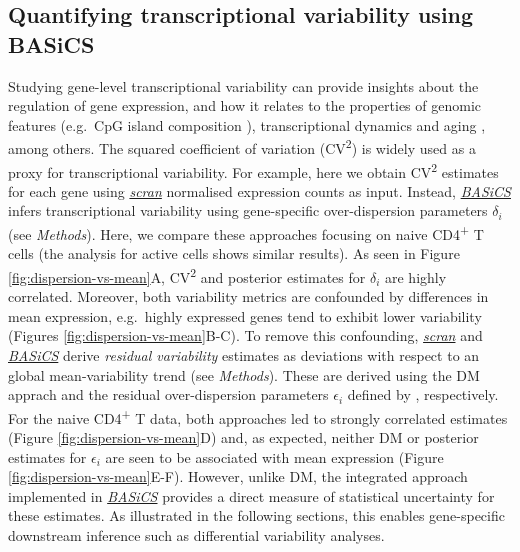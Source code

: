 \documentclass[9pt,a4paper,]{extarticle}
\begin{document}
\hypertarget{quantifying-transcriptional-variability-using-basics}{%
\subsection{Quantifying transcriptional variability using BASiCS}\label{quantifying-transcriptional-variability-using-basics}}

Studying gene-level transcriptional variability can provide insights about the
regulation of gene expression, and how it relates to the properties of genomic
features (e.g.~CpG island composition \citep{Morgan2018}), transcriptional dynamics
\citep{Antolovic2017} and aging \citep{Martinez-jimenez2017}, among others.
The squared coefficient of variation (CV\textsuperscript{2}) is widely used as a proxy for
transcriptional variability.
For example, here we obtain CV\textsuperscript{2} estimates for each gene using
\emph{\href{https://bioconductor.org/packages/3.11/scran}{scran}} normalised expression counts as input.
Instead, \emph{\href{https://bioconductor.org/packages/3.11/BASiCS}{BASiCS}} infers transcriptional variability using
gene-specific over-dispersion parameters \(\delta_i\) (see \emph{Methods}).
Here, we compare these approaches focusing on naive CD4\textsuperscript{+} T cells (the
analysis for active cells shows similar results).
As seen in Figure \ref{fig:dispersion-vs-mean}A, CV\textsuperscript{2} and posterior estimates
for \(\delta_i\) are highly correlated.
Moreover, both variability metrics are confounded by differences in mean
expression, e.g.~highly expressed genes tend to exhibit lower variability
(Figures \ref{fig:dispersion-vs-mean}B-C).
To remove this confounding, \emph{\href{https://bioconductor.org/packages/3.11/scran}{scran}} and \emph{\href{https://bioconductor.org/packages/3.11/BASiCS}{BASiCS}}
derive \emph{residual variability} estimates as deviations with respect to an
global mean-variability trend (see \emph{Methods}).
These are derived using the DM apprach \citep{Kolodziejczyk2015cell} and the
residual over-dispersion parameters \(\epsilon_i\) defined by \citep{Eling2018},
respectively.
For the naive CD4\textsuperscript{+} T data, both approaches led to strongly correlated
estimates (Figure \ref{fig:dispersion-vs-mean}D) and, as expected, neither DM
or posterior estimates for \(\epsilon_i\) are seen to be associated with
mean expression (Figure \ref{fig:dispersion-vs-mean}E-F).
However, unlike DM, the integrated approach implemented in \emph{\href{https://bioconductor.org/packages/3.11/BASiCS}{BASiCS}}
provides a direct measure of statistical uncertainty for these estimates.
As illustrated in the following sections, this enables gene-specific
downstream inference such as differential variability analyses.
\end{document}
